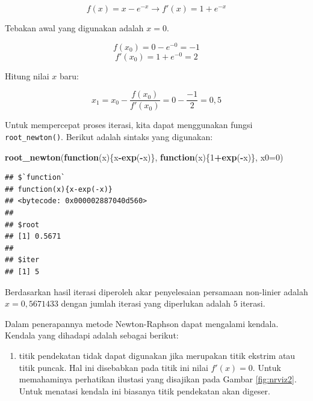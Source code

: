 \documentclass[
]{book}
\newenvironment{Shaded}{\begin{snugshade}}{\end{snugshade}}
\newcommand{\AttributeTok}[1]{\textcolor[rgb]{0.13,0.29,0.53}{#1}}
\newcommand{\ControlFlowTok}[1]{\textcolor[rgb]{0.13,0.29,0.53}{\textbf{#1}}}
\newcommand{\DecValTok}[1]{\textcolor[rgb]{0.00,0.00,0.81}{#1}}
\newcommand{\FunctionTok}[1]{\textcolor[rgb]{0.13,0.29,0.53}{\textbf{#1}}}
\newcommand{\NormalTok}[1]{#1}
\newcommand{\SpecialCharTok}[1]{\textcolor[rgb]{0.81,0.36,0.00}{\textbf{#1}}}
\providecommand{\tightlist}{%
  \setlength{\itemsep}{0pt}\setlength{\parskip}{0pt}}
\theoremstyle{definition}
\theoremstyle{definition}
\theoremstyle{definition}
\theoremstyle{definition}
\theoremstyle{remark}
\begin{document}
\[
f\left(x\right)=x-e^{-x}\to f'\left(x\right)=1+e^{-x}
\]

Tebakan awal yang digunakan adalah \(x=0\).

\[
f\left(x_0\right)=0-e^{-0}=-1
\]
\[
f'\left(x_0\right)=1+e^{-0}=2
\]

Hitung nilai \(x\) baru:

\[
x_1=x_0-\frac{f\left(x_0\right)}{f'\left(x_0\right)}=0-\frac{-1}{2}=0,5
\]

Untuk mempercepat proses iterasi, kita dapat menggunakan fungsi \texttt{root\_newton()}. Berikut adalah sintaks yang digunakan:

\begin{Shaded}
\begin{Highlighting}[]
\FunctionTok{root\_newton}\NormalTok{(}\ControlFlowTok{function}\NormalTok{(x)\{x}\SpecialCharTok{{-}}\FunctionTok{exp}\NormalTok{(}\SpecialCharTok{{-}}\NormalTok{x)\},}
            \ControlFlowTok{function}\NormalTok{(x)\{}\DecValTok{1}\SpecialCharTok{+}\FunctionTok{exp}\NormalTok{(}\SpecialCharTok{{-}}\NormalTok{x)\},}
              \AttributeTok{x0=}\DecValTok{0}\NormalTok{)}
\end{Highlighting}
\end{Shaded}

\begin{verbatim}
## $`function`
## function(x){x-exp(-x)}
## <bytecode: 0x000002887040d560>
## 
## $root
## [1] 0.5671
## 
## $iter
## [1] 5
\end{verbatim}

Berdasarkan hasil iterasi diperoleh akar penyelesaian persamaan non-linier adalah \(x=0,5671433\) dengan jumlah iterasi yang diperlukan adalah \(5\) iterasi.

Dalam penerapannya metode Newton-Raphson dapat mengalami kendala. Kendala yang dihadapi adalah sebagai berikut:

\begin{enumerate}
\def\labelenumi{\arabic{enumi}.}
\tightlist
\item
  titik pendekatan tidak dapat digunakan jika merupakan titik ekstrim atau titik puncak. Hal ini disebabkan pada titik ini nilai \(f'\left(x \right)=0\). Untuk memahaminya perhatikan ilustasi yang disajikan pada Gambar \ref{fig:nrviz2}. Untuk menatasi kendala ini biasanya titik pendekatan akan digeser.
\end{enumerate}
\end{document}
